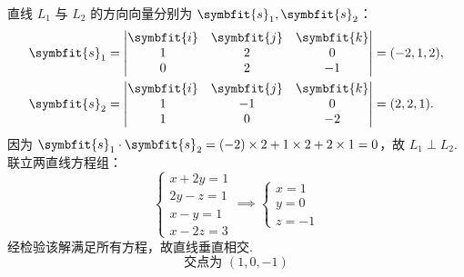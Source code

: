 \begin{solution}

    直线 $L_1$ 与 $L_2$ 的方向向量分别为 $\symbfit{s}_1, \symbfit{s}_2$：
    \begin{equation}
        \begin{aligned}
            \symbfit{s}_1 & = \begin{vmatrix} \symbfit{i} & \symbfit{j} & \symbfit{k} \\ 1 & 2 & 0 \\ 0 & 2 & -1 \end{vmatrix} = (-2, 1, 2), \\
            \symbfit{s}_2 & = \begin{vmatrix} \symbfit{i} & \symbfit{j} & \symbfit{k} \\ 1 & -1 & 0 \\ 1 & 0 & -2 \end{vmatrix} = (2, 2, 1).
        \end{aligned}
    \end{equation}
    因为 $\symbfit{s}_1 \cdot \symbfit{s}_2 = (-2) \times 2 + 1 \times 2 + 2 \times 1 = 0$，故 $L_1 \perp L_2$.
    联立两直线方程组：
    \begin{equation}
        \begin{cases} x + 2y = 1 \\ 2y - z = 1 \\ x - y = 1 \\ x - 2z = 3 \end{cases} \implies \begin{cases} x = 1 \\ y = 0 \\ z = -1 \end{cases}
    \end{equation}
    经检验该解满足所有方程，故直线垂直相交.
    \begin{equation}
        \boxed{ \text{交点为 } (1, 0, -1) }
    \end{equation}



\end{solution}
